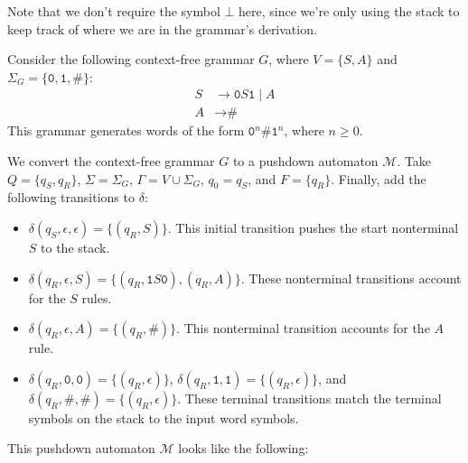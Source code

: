 Note that we don't require the symbol $\bot$ here, since we're only using the stack to keep track of where we are in the grammar's derivation.

\begin{example}
Consider the following context-free grammar $G$, where $V = \{S, A\}$ and $\Sigma_{G} = \{\texttt{0}, \texttt{1}, \texttt{\#}\}$:
\begin{align*}
S	&\rightarrow	\texttt{0}S\texttt{1} \mid A \\
A	&\rightarrow	\texttt{\#}
\end{align*}
This grammar generates words of the form $\texttt{0}^{n}\texttt{\#}\texttt{1}^{n}$, where $n \geq 0$.

We convert the context-free grammar $G$ to a pushdown automaton $\mathcal{M}$. Take $Q = \{q_{S}, q_{R}\}$, $\Sigma = \Sigma_{G}$, $\Gamma = V \cup \Sigma_{G}$, $q_{0} = q_{S}$, and $F = \{q_{R}\}$. Finally, add the following transitions to $\delta$:
\begin{itemize}
\item $\delta(q_{S}, \epsilon, \epsilon) = \{(q_{R}, S)\}$. This initial transition pushes the start nonterminal $S$ to the stack.
\item $\delta(q_{R}, \epsilon, S) = \{(q_{R}, \texttt{1}S\texttt{0}), (q_{R}, A)\}$. These nonterminal transitions account for the $S$ rules.
\item $\delta(q_{R}, \epsilon, A) = \{(q_{R}, \texttt{\#})\}$. This nonterminal transition accounts for the $A$ rule.
\item $\delta(q_{R}, \texttt{0}, \texttt{0}) = \{(q_{R}, \epsilon)\}$, $\delta(q_{R}, \texttt{1}, \texttt{1}) = \{(q_{R}, \epsilon)\}$, and $\delta(q_{R}, \texttt{\#}, \texttt{\#}) = \{(q_{R}, \epsilon)\}$. These terminal transitions match the terminal symbols on the stack to the input word symbols.
\end{itemize}
This pushdown automaton $\mathcal{M}$ looks like the following:
\begin{center}
\end{center}


\end{example}
